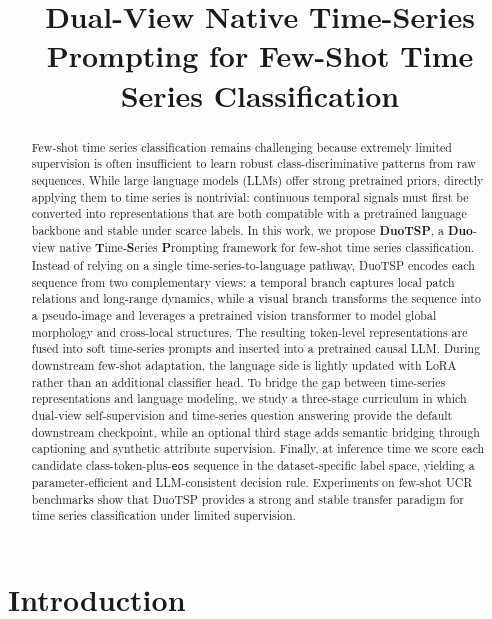 \documentclass{article}
\title{Dual-View Native Time-Series Prompting for Few-Shot Time Series Classification}
\author{}
\begin{document}
\maketitle


\begin{abstract}
  Few-shot time series classification remains challenging because extremely limited supervision is often insufficient to learn robust class-discriminative patterns from raw sequences. While large language models (LLMs) offer strong pretrained priors, directly applying them to time series is nontrivial: continuous temporal signals must first be converted into representations that are both compatible with a pretrained language backbone and stable under scarce labels. In this work, we propose \textbf{DuoTSP}, a \textbf{Duo}-view native \textbf{T}ime-\textbf{S}eries \textbf{P}rompting framework for few-shot time series classification. Instead of relying on a single time-series-to-language pathway, DuoTSP encodes each sequence from two complementary views: a temporal branch captures local patch relations and long-range dynamics, while a visual branch transforms the sequence into a pseudo-image and leverages a pretrained vision transformer to model global morphology and cross-local structures. The resulting token-level representations are fused into soft time-series prompts and inserted into a pretrained causal LLM. During downstream few-shot adaptation, the language side is lightly updated with LoRA rather than an additional classifier head. To bridge the gap between time-series representations and language modeling, we study a three-stage curriculum in which dual-view self-supervision and time-series question answering provide the default downstream checkpoint, while an optional third stage adds semantic bridging through captioning and synthetic attribute supervision. Finally, at inference time we score each candidate class-token-plus-\texttt{eos} sequence in the dataset-specific label space, yielding a parameter-efficient and LLM-consistent decision rule. Experiments on few-shot UCR benchmarks show that DuoTSP provides a strong and stable transfer paradigm for time series classification under limited supervision.
\end{abstract}

\section{Introduction}
\end{document}
